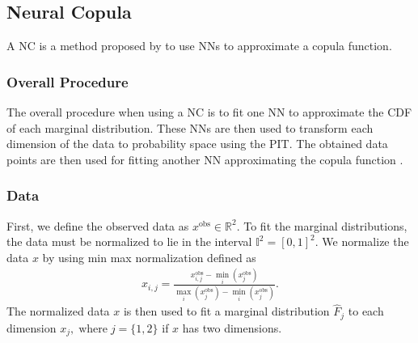 \subsection{Neural Copula}\label{sec:NeuralCopula}
A \gls{NC} is a method proposed by  to use \gls{NN}s to approximate a copula function. 


\subsubsection{Overall Procedure}
The overall procedure when using a \gls{NC} is to fit one \gls{NN} to approximate the \gls{CDF} of each marginal distribution. These \gls{NN}s are then used to transform each dimension of the data to probability space using the \gls{PIT}. The obtained data points are then used for fitting another \gls{NN} approximating the copula function . 

\subsubsection{Data}
First, we define the observed data as $x^{\mathrm{obs}}\in \mathbb{R}^2 $. To fit the marginal distributions, the data must be normalized to lie in the interval $\mathbb{I}^2 = [0,1]^2$. We normalize the data $x$ by using min max normalization defined as
\begin{align*}
    x_{i,j} = \frac{x_{i,j}^{\mathrm{obs}} - \min_i(x_{j}^{\mathrm{obs}})}{  \max_i(x_{j}^{\mathrm{obs}})- \min_i(x_{j}^{\mathrm{obs}})}.
\end{align*}
The normalized data $x$ is then used to fit a marginal distribution $\hat{F}_j$ to each dimension $x_j, \; \mathrm{where} \; j=\{1,2\}$ if $x$ has two dimensions. 


